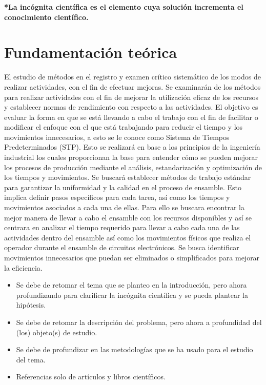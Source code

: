     \textbf{*La incógnita científica es el elemento cuya solución incrementa el conocimiento científico.}
    \section{Fundamentación teórica}
    
El estudio de métodos en el registro y examen crítico sistemático de los modos de realizar actividades, con el fin de efectuar mejoras.
Se examinarán de los métodos para realizar actividades con el fin de mejorar la utilización eficaz de los recursos y establecer normas de rendimiento con respecto a las actividades. El objetivo es evaluar la forma en que se está llevando a cabo el trabajo con el fin de facilitar o modificar el enfoque con el que está trabajando para reducir el tiempo y los movimientos innecesarios, a esto se le conoce como Sistema de Tiempos Predeterminados (STP). Esto se realizará en base a los principios de la ingeniería industrial los cuales proporcionan la base para entender cómo se pueden mejorar los procesos de producción mediante el análisis, estandarización y optimización de los tiempos y movimientos.
Se buscará establecer métodos de trabajo estándar para garantizar la uniformidad y la calidad en el proceso de ensamble. Esto implica definir pasos específicos para cada tarea, así como los tiempos y movimientos asociados a cada una de ellas. Para ello se buscara encontrar la mejor manera de llevar a cabo el ensamble con los recursos disponibles y  así se  centrara en analizar el tiempo requerido para llevar a cabo cada una de las actividades dentro del ensamble así como los movimientos físicos que realiza el operador durante el ensamble de circuitos electrónicos. Se busca identificar movimientos innecesarios que puedan ser eliminados o simplificados para mejorar la eficiencia.

    
    
    \begin{itemize}
        \item Se debe de retomar el tema que se planteo en la introducción, pero ahora profundizando para clarificar la incógnita científica y se pueda plantear la hipótesis.
        \item Se debe de retomar la descripción del problema, pero ahora a profundidad del (los) objeto(s) de estudio. 
        \item Se debe de profundizar en las metodologías que se ha usado para el estudio del tema.
        \item Referencias solo de artículos y libros científicos.
    \end{itemize}

